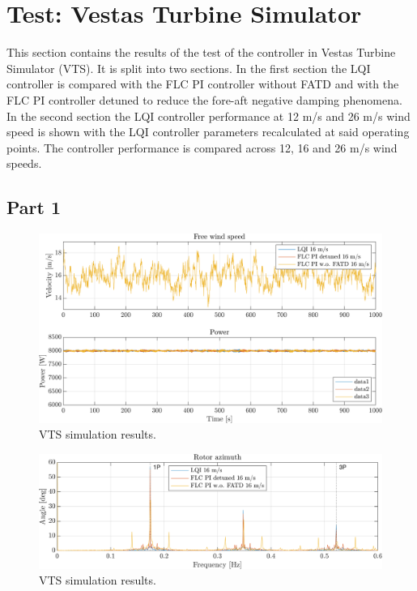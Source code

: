 \section{Test: Vestas Turbine Simulator} \label{sec:test_vts}
This section contains the results of the test of the controller in Vestas Turbine Simulator (VTS). It is split into two sections. In the first section the LQI controller is compared with the FLC PI controller without FATD and with the FLC PI controller detuned to reduce the fore-aft negative damping phenomena. In the second section the LQI controller performance at 12 m/s and 26 m/s wind speed is shown with the LQI controller parameters recalculated at said operating points. The controller performance is compared across 12, 16 and 26 m/s wind speeds.

\subsection{Part 1}


\begin{figure}[ht]
	\centering
	\includegraphics[width=0.7\linewidth]{Graphics/TestResults/VTSplotting/1_wind_pow.png}
	\caption{VTS simulation results.}
	\label{fig:vts_1_wind_pow}
\end{figure}

\begin{figure}[ht]
	\centering
	\includegraphics[width=0.7\linewidth]{Graphics/TestResults/VTSplotting/2_fftazi.png}
	\caption{VTS simulation results.}
	\label{fig:vts_2_fftazi}
\end{figure}

